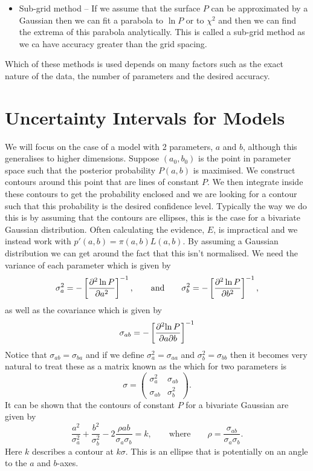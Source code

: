 \documentclass[a4paper]{article}
\begin{document}
\begin{itemize}
        \item Sub-grid method -- If we assume that the surface \(P\) can be approximated by a Gaussian then we can fit a parabola to \(\ln P\) or to \(\chi^2\) and then we can find the extrema of this parabola analytically.
        This is called a sub-grid method as we ca have accuracy greater than the grid spacing.
    \end{itemize}
    Which of these methods is used depends on many factors such as the exact nature of the data, the number of parameters and the desired accuracy.
    
    \section{Uncertainty Intervals for Models}
    We will focus on the case of a model with 2 parameters, \(a\) and \(b\), although this generalises to higher dimensions.
    Suppose \((a_0, b_0)\) is the point in parameter space such that the posterior probability \(P(a, b)\) is maximised.
    We construct contours around this point that are lines of constant \(P\).
    We then integrate inside these contours to get the probability enclosed and we are looking for a contour such that this probability is the desired confidence level.
    Typically the way we do this is by assuming that the contours are ellipses, this is the case for a bivariate Gaussian distribution.
    Often calculating the evidence, \(E\), is impractical and we instead work with \(p'(a, b) = \pi(a, b)L(a, b)\).
    By assuming a Gaussian distribution we can get around the fact that this isn't normalised.
    We need the variance of each parameter which is given by
    \[\sigma_a^2 = -\left[\pdv[2]{\ln P}{a}\right]^{-1}, \qquad\text{and}\qquad \sigma_b^2 = -\left[\pdv[2]{\ln P}{b}\right]^{-1},\]
    as well as the covariance which is given by
    \[\sigma_{ab} = -\left[\frac{\partial^2{\ln P}}{\partial{a}\partial{b}}\right]^{-1}\]
    Notice that \(\sigma_{ab} = \sigma_{ba}\) and if we define \(\sigma_a^2 = \sigma_{aa}\) and \(\sigma_b^2 = \sigma_{bb}\) then it becomes very natural to treat these as a matrix known as the  which for two parameters is
    \[
        \sigma = 
        \begin{pmatrix}
            \sigma_a^2 & \sigma_{ab}\\
            \sigma_{ab} & \sigma_b^2
        \end{pmatrix}
        .
    \]
    It can be shown that the contours of constant \(P\) for a bivariate Gaussian are given by
    \[\frac{a^2}{\sigma_a^2} + \frac{b^2}{\sigma_b^2} - 2\frac{\rho ab}{\sigma_a\sigma_b} = k, \qquad\text{where}\qquad \rho = \frac{\sigma_{ab}}{\sigma_a\sigma_b}.\]
    Here \(k\) describes a contour at \(k\sigma\).
    This is an ellipse that is potentially on an angle to the \(a\) and \(b\)-axes.
    
\end{document}
